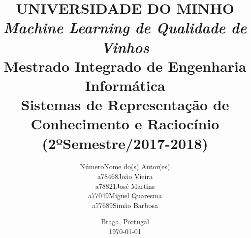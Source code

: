 \documentclass{article}
\begin{document}
\title{\Huge
       \textbf{UNIVERSIDADE DO MINHO}\\
       \vspace*{3cm}
       \huge
       \textbf{\textit{Machine Learning de Qualidade de Vinhos}\\
       \vspace*{3cm}
       \large
       Mestrado Integrado de Engenharia Informática\\
       \vspace*{2cm}
       Sistemas de Representação de Conhecimento e Raciocínio\\
       (2ºSemestre/2017-2018)
       \vspace*{\fill}}
}

\author{\hspace*{-5cm}Número\hspace*{1cm}Nome do(s) Autor(es)\hspace*{\fill}\\
        \hspace*{-5cm}a78468\hspace*{1cm}João Vieira\hspace*{\fill}\\
        \hspace*{-5cm}a78821\hspace*{1cm}José Martins\hspace*{\fill}\\
        \hspace*{-5cm}a77049\hspace*{1cm}Miguel Quaresma\hspace*{\fill}\\
        \hspace*{-5cm}a77689\hspace*{1cm}Simão Barbosa\hspace*{\fill}}

\date{\hspace*{\fill}Braga, Portugal\hspace*{1cm}\\
      \hspace*{\fill}\today\hspace*{1cm}}

\maketitle

\newpage

\justify

\vspace*{\fill}
\end{document}
